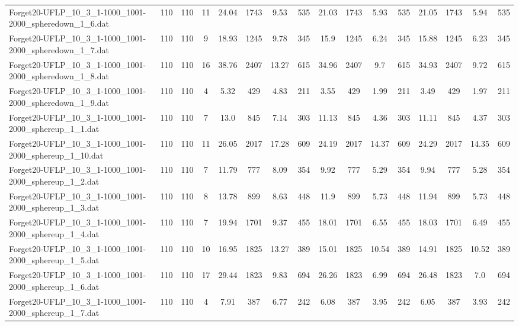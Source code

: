 \begin{sidewaystable}[!ht]
{\begin{tabular}{lccccccccccccccc}
Forget20-UFLP\_10\_3\_1-1000\_1001-2000\_spheredown\_1\_6.dat & 110 & 110 & 11 & 24.04 & 1743 & 9.53 & 535 & 21.03 & 1743 & 5.93 & 535 & 21.05 & 1743 & 5.94 & 535 \\
Forget20-UFLP\_10\_3\_1-1000\_1001-2000\_spheredown\_1\_7.dat & 110 & 110 & 9 & 18.93 & 1245 & 9.78 & 345 & 15.9 & 1245 & 6.24 & 345 & 15.88 & 1245 & 6.23 & 345 \\
Forget20-UFLP\_10\_3\_1-1000\_1001-2000\_spheredown\_1\_8.dat & 110 & 110 & 16 & 38.76 & 2407 & 13.27 & 615 & 34.96 & 2407 &  \textcolor{blue2}{9.7} & 615 & 34.93 & 2407 & 9.72 & 615 \\
Forget20-UFLP\_10\_3\_1-1000\_1001-2000\_spheredown\_1\_9.dat & 110 & 110 & 4 & 5.32 & 429 & 4.83 & 211 & 3.55 & 429 & 1.99 & 211 & 3.49 & 429 & 1.97 & 211 \\
Forget20-UFLP\_10\_3\_1-1000\_1001-2000\_sphereup\_1\_1.dat & 110 & 110 & 7 & 13.0 & 845 & 7.14 & 303 & 11.13 & 845 & 4.36 & 303 & 11.11 & 845 & 4.37 & 303 \\
Forget20-UFLP\_10\_3\_1-1000\_1001-2000\_sphereup\_1\_10.dat & 110 & 110 & 11 & 26.05 & 2017 & 17.28 & 609 & 24.19 & 2017 & 14.37 & 609 & 24.29 & 2017 &  \textcolor{blue2}{14.35} & 609 \\
Forget20-UFLP\_10\_3\_1-1000\_1001-2000\_sphereup\_1\_2.dat & 110 & 110 & 7 & 11.79 & 777 & 8.09 & 354 & 9.92 & 777 & 5.29 & 354 & 9.94 & 777 &  \textcolor{blue2}{5.28} & 354 \\
Forget20-UFLP\_10\_3\_1-1000\_1001-2000\_sphereup\_1\_3.dat & 110 & 110 & 8 & 13.78 & 899 & 8.63 & 448 & 11.9 & 899 &  \textcolor{blue2}{5.73} & 448 & 11.94 & 899 &  \textcolor{blue2}{5.73} & 448 \\
Forget20-UFLP\_10\_3\_1-1000\_1001-2000\_sphereup\_1\_4.dat & 110 & 110 & 7 & 19.94 & 1701 & 9.37 & 455 & 18.01 & 1701 & 6.55 & 455 & 18.03 & 1701 &  \textcolor{blue2}{6.49} & 455 \\
Forget20-UFLP\_10\_3\_1-1000\_1001-2000\_sphereup\_1\_5.dat & 110 & 110 & 10 & 16.95 & 1825 & 13.27 & 389 & 15.01 & 1825 & 10.54 & 389 & 14.91 & 1825 &  \textcolor{blue2}{10.52} & 389 \\
Forget20-UFLP\_10\_3\_1-1000\_1001-2000\_sphereup\_1\_6.dat & 110 & 110 & 17 & 29.44 & 1823 & 9.83 & 694 & 26.26 & 1823 &  \textcolor{blue2}{6.99} & 694 & 26.48 & 1823 & 7.0 & 694 \\
Forget20-UFLP\_10\_3\_1-1000\_1001-2000\_sphereup\_1\_7.dat & 110 & 110 & 4 & 7.91 & 387 & 6.77 & 242 & 6.08 & 387 & 3.95 & 242 & 6.05 & 387 &  \textcolor{blue2}{3.93} & 242 \\

\end{tabular}}
\end{sidewaystable}
